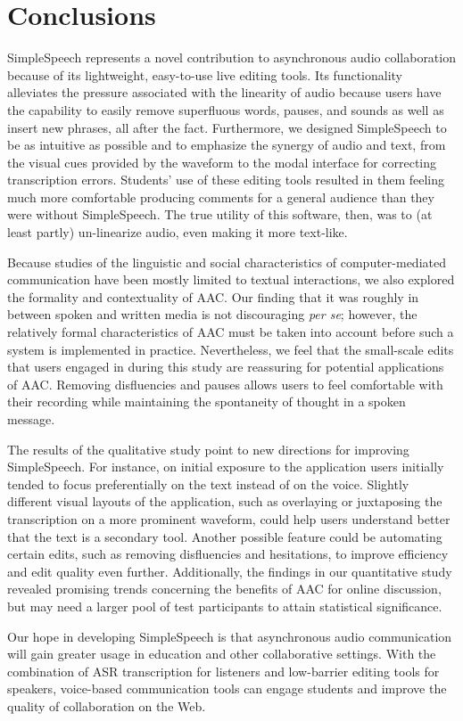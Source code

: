 \section{Conclusions}

SimpleSpeech represents a novel contribution to asynchronous audio collaboration because of its lightweight, easy-to-use live editing tools.
Its functionality alleviates the pressure associated with the linearity of audio because users have the capability to easily remove superfluous words, pauses, and sounds as well as insert new phrases, all after the fact.
Furthermore, we designed SimpleSpeech to be as intuitive as possible and to emphasize the synergy of audio and text, from the visual cues provided by the waveform to the modal interface for correcting transcription errors.
Students' use of these editing tools resulted in them feeling much more comfortable producing comments for a general audience than they were without SimpleSpeech.
The true utility of this software, then, was to (at least partly) un-linearize audio, even making it more text-like.

Because studies of the linguistic and social characteristics of computer-mediated communication have been mostly limited to textual interactions, we also explored the formality and contextuality of AAC. 
Our finding that it was roughly in between spoken and written media is not discouraging \textit{per se}; however, the relatively formal characteristics of AAC must be taken into account before such a system is implemented in practice.
Nevertheless, we feel that the small-scale edits that users engaged in during this study are reassuring for potential applications of AAC.
Removing disfluencies and pauses allows users to feel comfortable with their recording while maintaining the spontaneity of thought in a spoken message.

The results of the qualitative study point to new directions for improving SimpleSpeech. 
For instance, on initial exposure to the application users initially tended to focus preferentially on the text instead of on the voice.
Slightly different visual layouts of the application, such as overlaying or juxtaposing the transcription on a more prominent waveform, could help users understand better that the text is a secondary tool.
Another possible feature could be automating certain edits, such as removing disfluencies and hesitations, to improve efficiency and edit quality even further.
Additionally, the findings in our quantitative study revealed promising trends concerning the benefits of AAC for online discussion, but may need a larger pool of test participants to attain statistical significance.

Our hope in developing SimpleSpeech is that asynchronous audio communication will gain greater usage in education and other collaborative settings. 
With the combination of ASR transcription for listeners and low-barrier editing tools for speakers, voice-based communication tools can engage students and improve the quality of collaboration on the Web.